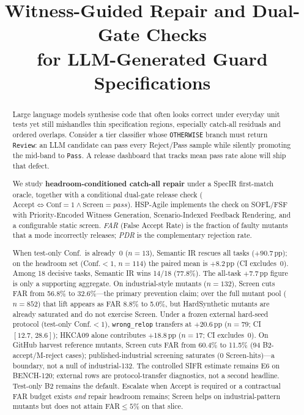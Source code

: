 \documentclass[10pt,conference]{IEEEtran}
\title{Witness-Guided Repair and Dual-Gate Checks\\
for LLM-Generated Guard Specifications}
\author{
\IEEEauthorblockN{Ye Xujun}
\IEEEauthorblockA{East China Normal University\\
Shanghai, China}
}
\begin{document}
\maketitle

\begin{abstract}
Large language models synthesise code that often looks correct under everyday
unit tests yet still mishandles thin specification regions, especially
catch-all residuals and ordered overlaps.
Consider a tier classifier whose \texttt{OTHERWISE} branch must return
\texttt{Review}: an LLM candidate can pass every Reject/Pass sample while
silently promoting the mid-band to \texttt{Pass}.
A release dashboard that tracks mean pass rate alone will ship that defect.

We study \textbf{headroom-conditioned catch-all repair} under a SpecIR
first-match oracle, together with a conditional dual-gate release check
($\mathrm{Accept}\Leftrightarrow\mathrm{Conf}{=}1\wedge\mathrm{Screen}{=}\mathit{pass}$).
HSP-Agile implements the check on SOFL/FSF with Priority-Encoded Witness
Generation, Scenario-Indexed Feedback Rendering, and a configurable static
screen.
\emph{FAR} (False Accept Rate) is the fraction of faulty mutants that a mode
incorrectly releases; \emph{PDR} is the complementary rejection rate.

When test-only Conf.\ is already~$0$ ($n{=}13$), Semantic IR rescues all tasks
(${+}90.7$\,pp); on the headroom set (Conf.${<}1$, $n{=}114$) the paired mean
is ${+}8.2$\,pp (CI excludes~0).
Among 18 decisive tasks, Semantic IR wins 14/18 (77.8\%).
The all-task ${+}7.7$\,pp figure is only a supporting aggregate.
On industrial-style mutants ($n{=}132$), Screen cuts FAR from 56.8\% to
32.6\%---the primary prevention claim; over the full mutant pool ($n{=}852$)
that lift appears as FAR 8.8\% to 5.0\%, but HardSynthetic mutants are already
saturated and do not exercise Screen.
Under a frozen external hard-seed protocol (test-only Conf.${<}1$),
\texttt{wrong\_relop} transfers at ${+}20.6$\,pp ($n{=}79$; CI $[12.7,\,28.6]$);
HKCA09 alone contributes ${+}18.8$\,pp ($n{=}17$; CI excludes~0).
On GitHub harvest reference mutants, Screen cuts FAR from 60.4\% to 11.5\%
(94 B2-accept/M-reject cases); published-industrial screening saturates
(0 Screen-hits)---a boundary, not a null of industrial-132.
The controlled SIFR estimate remains E6 on BENCH-120; external rows are
protocol-transfer diagnostics, not a second headline.
Test-only B2 remains the default.
Escalate when Accept is required or a contractual FAR budget exists \emph{and}
repair headroom remains; Screen helps on industrial-pattern mutants but does
not attain FAR${\le}5\%$ on that slice.
\end{abstract}
\end{document}
